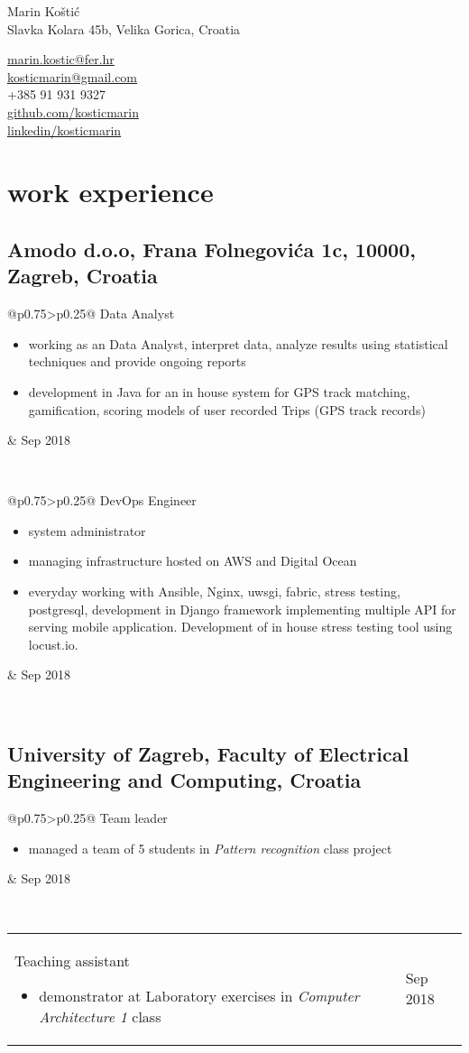 \documentclass[a4paper]{article}
\makeatletter
\newlength{\tablewidth}
\newenvironment{period}[2]{%
\newcommand{\sarma}{#2}%
\setlength{\tablewidth}{\linewidth}
\addtolength{\tablewidth}{-2\tabcolsep}
\begin{tabular}{@{}p{0.75\tablewidth}>{\raggedleft\arraybackslash}p{0.25\tablewidth}@{}}%
#1 \newline
\begin{itemize}
}{%
\end{itemize} & \sarma \\%
\end{tabular}\\
}
\makeatother
\begin{document}
\fontfamily{\sfdefault}
\selectfont

\begin{minipage}{.5\textwidth}
\LARGE{Marin Koštić}\\
\normalsize{Slavka Kolara 45b, Velika Gorica, Croatia}
\end{minipage}%
\begin{minipage}{.5\textwidth}
\raggedleft
\href{mailto:marin.kostic@fer.hr}{marin.kostic@fer.hr} \\
\href{mailto:kosticmarin@gmail.com}{kosticmarin@gmail.com}\\
+385 91 931 9327 \\
\href{https://github.com/kosticmarin}{github.com/kosticmarin}\\
\href{https://www.linkedin.com/in/marin-koštić-495949155}{linkedin/kosticmarin}
\end{minipage}

\vspace{1em}

\section{work experience}
\subsection{Amodo d.o.o, Frana Folnegovića 1c, 10000, Zagreb, Croatia}
\begin{period}{Data Analyst}{Sep 2018}
	\item working as an Data Analyst, interpret data, analyze results using statistical techniques and provide ongoing reports
	\item development in Java for an in house system for GPS track matching, gamification, scoring models of user recorded Trips (GPS track records)
\end{period}
\begin{period}{DevOps Engineer}{Jul 2017 -- Sep 2018}
	\item system administrator
	\item managing infrastructure hosted on AWS and Digital Ocean
	\item everyday working with Ansible, Nginx, uwsgi, fabric, stress testing, postgresql, development in Django framework implementing multiple API for serving
	mobile application. Development of in house stress testing tool using locust.io.
\end{period}
\subsection{University of Zagreb, Faculty of Electrical Engineering and Computing, Croatia}
\begin{period}{Team leader}{Sep 2016 -- Jan 2017}
    \item managed a team of 5 students in \textit{Pattern recognition} class project
\end{period}
\begin{period}{Teaching assistant}{Jan 2015 -- May 2015}
	\item demonstrator at Laboratory exercises in \textit{Computer Architecture 1} class
\end{period}
\end{document}
